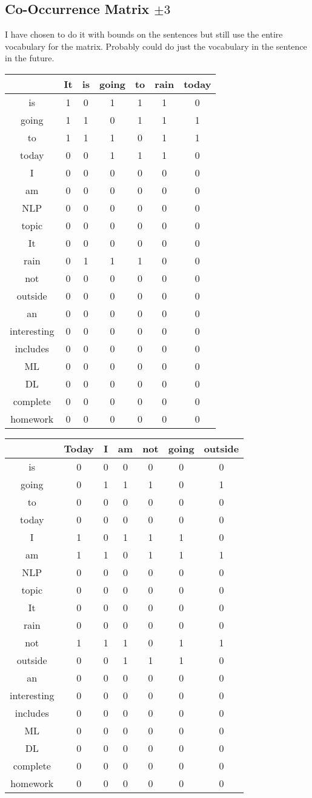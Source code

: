 \subsection{Co-Occurrence Matrix $\pm3$}
I have chosen to do it with bounds on the sentences but still use the entire vocabulary for the matrix. Probably could do just the vocabulary in the sentence in the future. 
\begin{center}
\begin{tabular}{||c ||c c c c c c||}
\hline
&It&is&going&to&rain&today\\
\hline
is		&1&0&1&1&1&0\\
going		&1&1&0&1&1&1\\
to		&1&1&1&0&1&1\\
today		&0&0&1&1&1&0\\
I		&0&0&0&0&0&0\\
am		&0&0&0&0&0&0\\
NLP		&0&0&0&0&0&0\\
topic		&0&0&0&0&0&0\\
It		&0&0&0&0&0&0\\
rain		&0&1&1&1&0&0\\
not		&0&0&0&0&0&0\\
outside		&0&0&0&0&0&0\\
an		&0&0&0&0&0&0\\
interesting	&0&0&0&0&0&0\\
includes	&0&0&0&0&0&0\\
ML		&0&0&0&0&0&0\\
DL		&0&0&0&0&0&0\\
complete	&0&0&0&0&0&0\\
homework	&0&0&0&0&0&0\\
\hline
\end{tabular}

\begin{tabular}{||c|| c c c c c c||}
\hline
&Today&I&am&not&going&outside\\
\hline
is		&0&0&0&0&0&0\\
going		&0&1&1&1&0&1\\
to		&0&0&0&0&0&0\\
today		&0&0&0&0&0&0\\
I		&1&0&1&1&1&0\\
am		&1&1&0&1&1&1\\
NLP		&0&0&0&0&0&0\\
topic		&0&0&0&0&0&0\\
It		&0&0&0&0&0&0\\
rain		&0&0&0&0&0&0\\
not		&1&1&1&0&1&1\\
outside		&0&0&1&1&1&0\\
an		&0&0&0&0&0&0\\
interesting	&0&0&0&0&0&0\\
includes	&0&0&0&0&0&0\\
ML		&0&0&0&0&0&0\\
DL		&0&0&0&0&0&0\\
complete	&0&0&0&0&0&0\\
homework	&0&0&0&0&0&0\\
\hline
\end{tabular}


\end{center}
